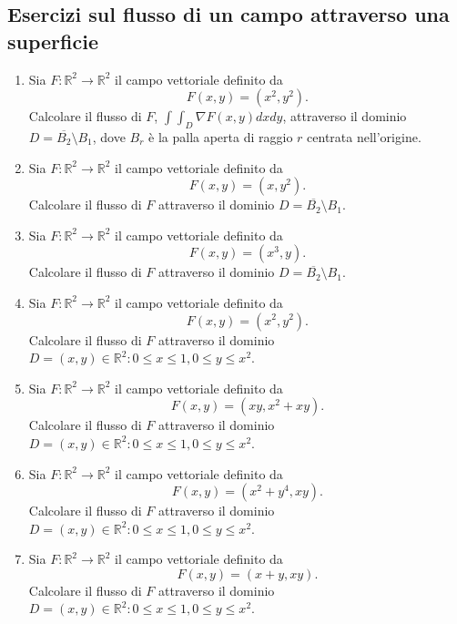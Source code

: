 \subsection*{Esercizi sul flusso di un campo attraverso una superficie }

\begin{enumerate}[label=\textbf{\arabic*}, leftmargin=*, start=1]
	
	\item Sia \( F: \mathbb{R}^2 \to \mathbb{R}^2 \) il campo vettoriale definito da
	\[
	F(x, y) = (x^2, y^2).
	\]
	Calcolare il flusso di \( F \), $\int\int_D \nabla F(x,y) dxdy$, attraverso il dominio \( D = \overline{B_2} \setminus B_1 \), dove \( B_r \) è la palla aperta di raggio \( r \) centrata nell'origine.
	
	\item Sia \( F: \mathbb{R}^2 \to \mathbb{R}^2 \) il campo vettoriale definito da
	\[
	F(x, y) = (x, y^2).
	\]
	Calcolare il flusso di \( F \) attraverso il dominio \( D = \overline{B_2} \setminus B_1 \).
	
	\item Sia \( F: \mathbb{R}^2 \to \mathbb{R}^2 \) il campo vettoriale definito da
	\[
	F(x, y) = (x^3, y).
	\]
	Calcolare il flusso di \( F \) attraverso il dominio \( D = \overline{B_2} \setminus B_1 \).
	
	\item Sia \( F: \mathbb{R}^2 \to \mathbb{R}^2 \) il campo vettoriale definito da
	\[
	F(x, y) = (x^2, y^2).
	\]
	Calcolare il flusso di \( F \) attraverso il dominio \( D = {(x,y)\in\mathbb{R}^2: 0\leq x\leq 1, 0\leq y\leq x^2} \).
	
	\item Sia \( F: \mathbb{R}^2 \to \mathbb{R}^2 \) il campo vettoriale definito da
	\[
	F(x, y) = (xy, x^2+xy).
	\]
	Calcolare il flusso di \( F \) attraverso il dominio \( D = {(x,y)\in\mathbb{R}^2: 0\leq x\leq 1, 0\leq y\leq x^2} \).
	
	\item Sia \( F: \mathbb{R}^2 \to \mathbb{R}^2 \) il campo vettoriale definito da
	\[
	F(x, y) = (x^2 + y^4, xy).
	\]
	Calcolare il flusso di \( F \) attraverso il dominio \( D = {(x,y)\in\mathbb{R}^2: 0\leq x\leq 1, 0\leq y\leq x^2} \).
	
	\item Sia \( F: \mathbb{R}^2 \to \mathbb{R}^2 \) il campo vettoriale definito da
	\[
	F(x, y) = \left( x+y, xy \right).
	\]
	Calcolare il flusso di \( F \) attraverso il dominio \( D = {(x,y)\in\mathbb{R}^2: 0\leq x\leq 1, 0\leq y\leq x^2} \).
	

\end{enumerate}
